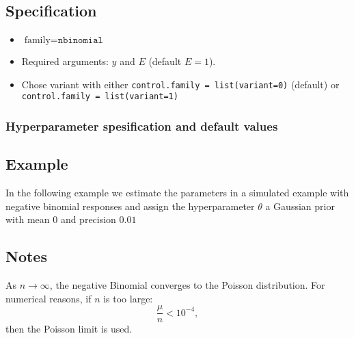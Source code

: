 \documentclass[a4paper,11pt]{article}
\begin{document}
\subsection*{Specification}

\begin{itemize}
\item $\text{family}=\texttt{nbinomial}$
\item Required arguments: $y$ and $E$ (default $E=1$).
\item Chose variant with either
    \verb|control.family = list(variant=0)| (default) or\\
    \verb|control.family = list(variant=1)|
\end{itemize}

\subsubsection*{Hyperparameter spesification and default values}



\subsection*{Example}

In the following example we estimate the parameters in a simulated
example with negative binomial responses and assign the hyperparameter
$\theta$ a Gaussian prior with mean $0$ and precision $0.01$


\subsection*{Notes}

As $n\rightarrow\infty$, the negative Binomial converges to the
Poisson distribution. For numerical reasons, if $n$ is too large:
\begin{displaymath}
    \frac{\mu}{n} < 10^{-4},
\end{displaymath}
then the Poisson limit is used.
\end{document}

